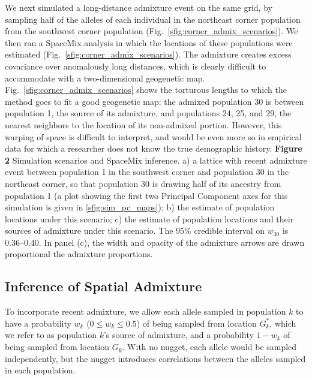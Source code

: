 \documentclass[10pt,letterpaper]{article}
\newcommand{\kadmixsource}[1]{{$G^{*}_{#1}$}}
\begin{document}
We next simulated a long-distance admixture event on the same grid,
by sampling half of the alleles of each individual in the northeast corner population from the southwest corner population (Fig.\ \ref{sfig:corner_admix_scenarios}).  We then ran a SpaceMix analysis in which the locations of these populations were estimated (Fig.\ \ref{sfig:corner_admix_scenarios}).
The admixture creates excess covariance over anomalously long distances, which is clearly difficult to accommodate with a two-dimensional geogenetic map.
Fig.\ \ref{sfig:corner_admix_scenarios} shows the torturous lengths to which the method goes to fit a good geogenetic map: the admixed population 30 is between population 1, the source of its admixture, and populations 24, 25, and 29, the nearest neighbors to the location of its non-admixed portion.
However, this warping of space is difficult to interpret, and would be even more so in empirical data for which a researcher does not know the true demographic history.  
%
\newline\newline
{\bf{Figure 2}} Simulation scenarios and SpaceMix inference.  a) a lattice with recent admixture event between population 1 in the southwest corner and population 30 in the northeast corner, so that population 30 is drawing half of its ancestry from population 1 (a plot showing the first two Principal Component axes for this simulation is given in \ref{sfig:sim_pc_maps}); b) the estimate of population locations under this scenario; c) the estimate of population locations and their sources of admixture under this scenario.  The 95\% credible interval on $w_{30}$ is 0.36--0.40. In panel (c), the width and opacity of the admixture arrows are drawn proportional the admixture proportions.
\newline\newline

\subsection*{Inference of Spatial Admixture}

To incorporate recent admixture, 
we allow each allele sampled in population $k$ to have a probability $w_k$ ($0 \leq w_k \leq 0.5$) of being sampled from location \kadmixsource{k},
which we refer to as population $k$'s source of admixture,
and a probability $1-w_k$ of being sampled from location $G_k$.
With no nugget, each allele would be sampled independently, but the nugget introduces correlations between the alleles sampled in each population.
\end{document}
